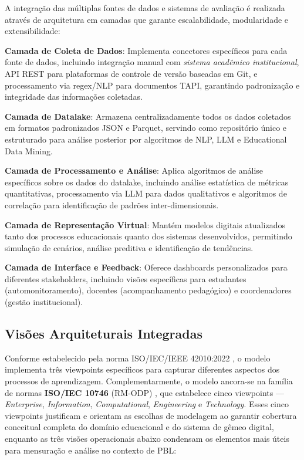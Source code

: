 \documentclass[12pt,a4paper]{article}
\renewcommand{\cite}[1]{}
\begin{document}
A integração das múltiplas fontes de dados e sistemas de avaliação é realizada
através de arquitetura em camadas que garante escalabilidade, modularidade e
extensibilidade:

\textbf{Camada de Coleta de Dados}: Implementa conectores específicos para cada fonte de dados, incluindo integração manual com \textit{sistema acadêmico institucional}, API REST para plataformas de controle de versão baseadas em Git, e processamento via regex/NLP para documentos TAPI, garantindo padronização e integridade das informações coletadas.

\textbf{Camada de Datalake}: Armazena centralizadamente todos os dados coletados em formatos padronizados JSON e Parquet, servindo como repositório único e estruturado para análise posterior por algoritmos de NLP, LLM e Educational Data Mining.

\textbf{Camada de Processamento e Análise}: Aplica algoritmos de análise específicos sobre os dados do datalake, incluindo análise estatística de métricas quantitativas, processamento via LLM para dados qualitativos e algoritmos de correlação para identificação de padrões inter-dimensionais.

\textbf{Camada de Representação Virtual}: Mantém modelos digitais atualizados tanto dos processos educacionais quanto dos sistemas desenvolvidos, permitindo simulação de cenários, análise preditiva e identificação de tendências.

\textbf{Camada de Interface e Feedback}: Oferece dashboards personalizados para diferentes stakeholders, incluindo visões específicas para estudantes (automonitoramento), docentes (acompanhamento pedagógico) e coordenadores (gestão institucional).

\subsection{Visões Arquiteturais Integradas}

Conforme estabelecido pela norma ISO/IEC/IEEE 42010:2022 \cite{iso42010}, o
modelo implementa três viewpoints específicos para capturar diferentes aspectos
dos processos de aprendizagem. Complementarmente, o modelo ancora-se na família
de normas \textbf{ISO/IEC 10746} (RM-ODP) \cite{iso10746}, que estabelece cinco
viewpoints — \textit{Enterprise}, \textit{Information}, \textit{Computational},
\textit{Engineering} e \textit{Technology}. Esses cinco viewpoints justificam e
orientam as escolhas de modelagem ao garantir cobertura conceitual completa do
domínio educacional e do sistema de gêmeo digital, enquanto as três visões
operacionais abaixo condensam os elementos mais úteis para mensuração e análise
no contexto de PBL:
\end{document}
